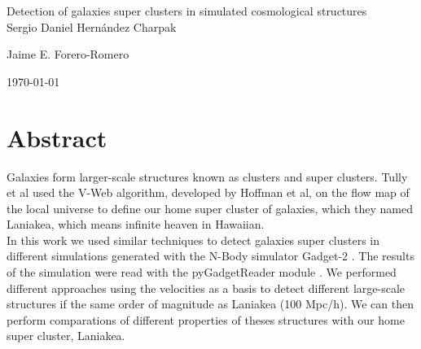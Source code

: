 \documentclass[12pt]{article}
\begin{document}
\begin{center}
\Huge
Detection of galaxies super clusters in simulated cosmological structures\\  
\vspace{3mm}
\normalsize Sergio Daniel Hern\'{a}ndez Charpak

\vspace{2mm}
\normalsize Jaime E. Forero-Romero

\normalsize
\vspace{2mm}

\today
\end{center}


\normalsize
\section{Abstract}

Galaxies form larger-scale structures known as clusters and super clusters. Tully et al \cite{tully_laniakea_2014} used the V-Web algorithm, developed by Hoffman et al\cite{hoffman_kinematic_2012}, on the flow map of the local universe \cite{tully_cosmicflows-2_2013} to define our home super cluster of galaxies, which they named Laniakea, which means infinite heaven in Hawaiian. 
\\
In this work we used similar techniques to detect galaxies super clusters in different simulations generated with the N-Body simulator Gadget-2 \cite{springel_gadget_2_2005}. The results of the simulation were read with the pyGadgetReader module \cite{thompson_pygadgetreader_2014ascl_soft11001T}. We performed different approaches using the velocities as a basis to detect different large-scale structures if the same order of magnitude as Laniakea (100 Mpc/h). We can then perform comparations of different properties of theses structures with our home super cluster, Laniakea.





\renewcommand\refname{References}

\end{document}

